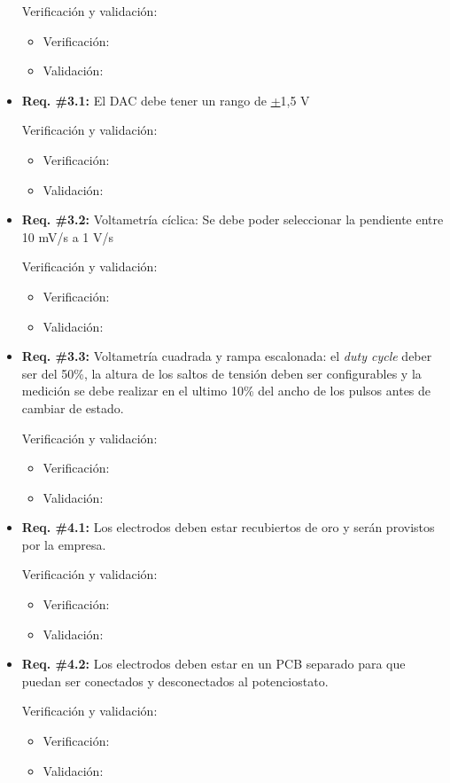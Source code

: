 \documentclass[11pt]{charter}
\begin{document}
\begin{itemize}
Verificación y validación:
\begin{itemize}
\item Verificación: 
\item Validación: 
\end{itemize}

\item \textbf{Req. \#3.1:} El DAC debe tener un rango de \underline{+}1,5 V

Verificación y validación:
\begin{itemize}
\item Verificación: 
\item Validación: 
\end{itemize}

\item \textbf{Req. \#3.2:} Voltametría cíclica: Se debe poder seleccionar la pendiente entre 10 mV/s a 1 V/s 

Verificación y validación:
\begin{itemize}
\item Verificación: 
\item Validación: 
\end{itemize}

\item \textbf{Req. \#3.3:} Voltametría cuadrada y rampa escalonada: el \textit{duty cycle} deber ser del 50\%, la altura de los saltos de tensión deben ser configurables y la medición se debe realizar en el ultimo 10\% del ancho de los pulsos antes de cambiar de estado.

Verificación y validación:
\begin{itemize}
\item Verificación: 
\item Validación: 
\end{itemize}

\item \textbf{Req. \#4.1:} Los electrodos deben estar recubiertos de oro y serán provistos por la empresa.

Verificación y validación:
\begin{itemize}
\item Verificación: 
\item Validación: 
\end{itemize}

\item \textbf{Req. \#4.2:} Los electrodos deben estar en un PCB separado para que puedan ser conectados y desconectados al potenciostato.

Verificación y validación:
\begin{itemize}
\item Verificación: 
\item Validación: 
\end{itemize}
\end{itemize}
\end{document}
